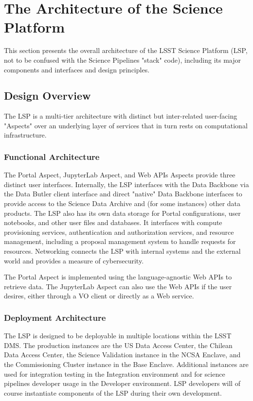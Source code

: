 \section{The Architecture of the Science Platform}\label{architecture}

This section presents the overall architecture of the LSST Science Platform
(LSP, not to be confused with the Science Pipelines "stack" code), including
its major components and interfaces and design principles.

\subsection{Design Overview}\label{design-overview}

The LSP is a multi-tier architecture with distinct but inter-related
user-facing "Aspects" over an underlying layer of services that in turn
rests on computational infrastructure.

\subsubsection{Functional Architecture}\label{functional-architecture}

The Portal Aspect, JupyterLab Aspect, and Web APIs Aspects provide three
distinct user interfaces.  Internally, the LSP interfaces with the Data
Backbone via the Data Butler client interface and direct "native" Data Backbone
interfaces to provide access to the Science Data Archive and (for some
instances) other data products.  The LSP also has its own data storage for
Portal configurations, user notebooks, and other user files and databases.  It
interfaces with compute provisioning services, authentication and authorization
services, and resource management, including a proposal management system to
handle requests for resources.  Networking connects the LSP with internal
systems and the external world and provides a measure of cybersecurity.

The Portal Aspect is implemented using the language-agnostic Web APIs to
retrieve data.  The JupyterLab Aspect can also use the Web APIs if the user
desires, either through a VO client or directly as a Web service.

\subsubsection{Deployment Architecture}\label{deployment-architecture}

The LSP is designed to be deployable in multiple locations within the LSST DMS.
The production instances are the US Data Access Center, the Chilean Data Access
Center, the Science Validation instance in the NCSA Enclave, and the
Commissioning Cluster instance in the Base Enclave.  Additional instances are
used for integration testing in the Integration environment and for science
pipelines developer usage in the Developer environment.  LSP developers will
of course instantiate components of the LSP during their own development.

